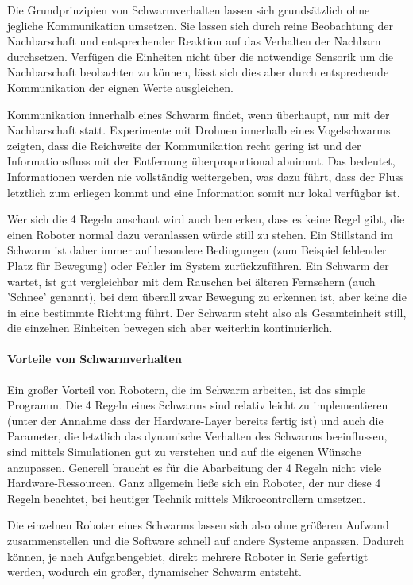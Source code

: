 Die Grundprinzipien von Schwarmverhalten lassen sich grundsätzlich ohne jegliche Kommunikation umsetzen.
Sie lassen sich durch reine Beobachtung der Nachbarschaft und entsprechender Reaktion auf das Verhalten der Nachbarn durchsetzen.
Verfügen die Einheiten nicht über die notwendige Sensorik um die Nachbarschaft beobachten zu können, lässt sich dies aber durch entsprechende Kommunikation der eignen Werte ausgleichen.

Kommunikation innerhalb eines Schwarm findet, wenn überhaupt, nur mit der Nachbarschaft statt.
Experimente mit Drohnen innerhalb eines Vogelschwarms zeigten, dass die Reichweite der Kommunikation recht gering ist und der Informationsfluss mit der Entfernung überproportional abnimmt.
Das bedeutet, Informationen werden nie vollständig weitergeben, was dazu führt, dass der Fluss letztlich zum erliegen kommt und eine Information somit nur lokal verfügbar ist.\cite{LocalInformation}

Wer sich die 4 Regeln anschaut wird auch bemerken, dass es keine Regel gibt, die einen Roboter normal dazu veranlassen würde still zu stehen.
Ein Stillstand im Schwarm ist daher immer auf besondere Bedingungen (zum Beispiel fehlender Platz für Bewegung) oder Fehler im System zurückzuführen.
Ein Schwarm der wartet, ist gut vergleichbar mit dem Rauschen bei älteren Fernsehern (auch 'Schnee' genannt), bei dem überall zwar Bewegung zu erkennen ist, aber keine die in eine bestimmte Richtung führt.
Der Schwarm steht also als Gesamteinheit still, die einzelnen Einheiten bewegen sich aber weiterhin kontinuierlich.\cite{VicsekAnalyses}\cite{FlockNoise}\cite{ReynoldsFlocks}

\paragraph*{Vorteile von Schwarmverhalten}

Ein großer Vorteil von Robotern, die im Schwarm arbeiten, ist das simple Programm. Die 4 Regeln eines Schwarms sind relativ leicht zu implementieren (unter der Annahme dass der Hardware-Layer bereits fertig ist) und auch die Parameter, die letztlich das dynamische Verhalten des Schwarms beeinflussen, sind mittels Simulationen gut zu verstehen und auf die eigenen Wünsche anzupassen. Generell braucht es für die Abarbeitung der 4 Regeln nicht viele Hardware-Ressourcen. Ganz allgemein ließe sich ein Roboter, der nur diese 4 Regeln beachtet, bei heutiger Technik mittels Mikrocontrollern umsetzen.

Die einzelnen Roboter eines Schwarms lassen sich also ohne größeren Aufwand zusammenstellen und die Software schnell auf andere Systeme anpassen. Dadurch können, je nach Aufgabengebiet, direkt mehrere Roboter in Serie gefertigt werden, wodurch ein großer, dynamischer Schwarm entsteht.

